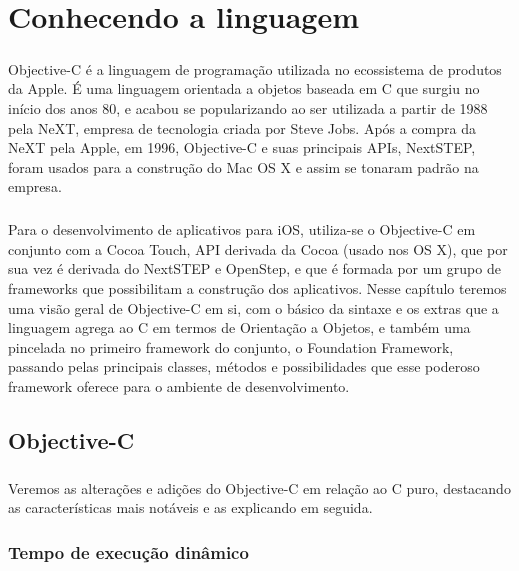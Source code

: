 \documentclass[a4paper,12pt,brazil,doubleside]{book}
\begin{document}
\chapter{Conhecendo a linguagem}

\paragraph{}Objective-C é a linguagem de programação utilizada no ecossistema de produtos da Apple. É uma linguagem orientada a objetos baseada em C que surgiu no início dos anos 80, e acabou se popularizando ao ser utilizada a partir de 1988 pela NeXT, empresa de tecnologia criada por Steve Jobs. Após a compra da NeXT pela Apple, em 1996, Objective-C e suas principais APIs, NextSTEP, foram usados para a construção do Mac OS X e assim se tonaram padrão na empresa.
\paragraph{}Para o desenvolvimento de aplicativos para iOS, utiliza-se o Objective-C em conjunto com a Cocoa Touch, API derivada da Cocoa (usado nos OS X), que por sua vez é derivada do NextSTEP e OpenStep, e que é formada por um grupo de frameworks que possibilitam a construção dos aplicativos. Nesse capítulo teremos uma visão geral de Objective-C em si, com o básico da sintaxe e os extras que a linguagem agrega ao C em termos de Orientação a Objetos, e também uma pincelada no primeiro framework do conjunto, o Foundation Framework, passando pelas principais classes, métodos e possibilidades que esse poderoso framework oferece para o ambiente de desenvolvimento.

\bigskip 
\bigskip


\section{Objective-C}

\paragraph{}Veremos as alterações e adições do Objective-C em relação ao C puro, destacando as características mais notáveis e as explicando em seguida.

\bigskip 
\bigskip

\subsection{Tempo de execução dinâmico}
\end{document}
